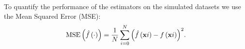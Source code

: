 To quantify the performance of the estimators on the simulated datasets we use the Mean Squared Error (MSE):
\begin{equation*}
	\varMSE{\varEstimatedDensityFunction{\cdot}} = \frac{1}{\varNumPatterns} \sum_{i = 0}^{\varNumPatterns} {\left(\varEstimatedDensityFunction{\varPattern{i}} - \varDensityFunction{\varPattern{i}} \right)}^2.
\end{equation*}
